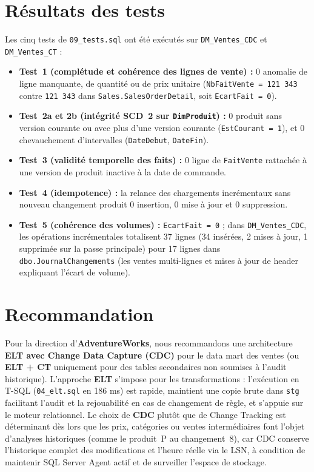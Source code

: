 \documentclass[9pt,a4paper]{article}
\begin{document}
\section{Résultats des tests}

Les cinq tests de \texttt{09\_tests.sql} ont été exécutés sur \texttt{DM\_Ventes\_CDC} et \texttt{DM\_Ventes\_CT} :
\begin{itemize}
  \item \textbf{Test~1 (complétude et cohérence des lignes de vente) :} 0 anomalie de ligne manquante, de quantité ou de prix unitaire (\texttt{NbFaitVente = 121\,343} contre \texttt{121\,343} dans \texttt{Sales.SalesOrderDetail}, soit \texttt{EcartFait = 0}).
  \item \textbf{Test~2a et 2b (intégrité SCD~2 sur \texttt{DimProduit}) :} 0 produit sans version courante ou avec plus d'une version courante (\texttt{EstCourant = 1}), et 0 chevauchement d'intervalles (\texttt{DateDebut}, \texttt{DateFin}).
  \item \textbf{Test~3 (validité temporelle des faits) :} 0 ligne de \texttt{FaitVente} rattachée à une version de produit inactive à la date de commande.
  \item \textbf{Test~4 (idempotence) :} la relance des chargements incrémentaux sans nouveau changement produit 0 insertion, 0 mise à jour et 0 suppression.
  \item \textbf{Test~5 (cohérence des volumes) :} \texttt{EcartFait = 0} ; dans \texttt{DM\_Ventes\_CDC}, les opérations incrémentales totalisent 37 lignes (34 insérées, 2 mises à jour, 1 supprimée sur la passe principale) pour 17 lignes dans \texttt{dbo.JournalChangements} (les ventes multi-lignes et mises à jour de header expliquant l'écart de volume).
\end{itemize}

\section{Recommandation}

Pour la direction d'\textbf{AdventureWorks}, nous recommandons une architecture \textbf{ELT avec Change Data Capture (CDC)} pour le data mart des ventes (ou \textbf{ELT + CT} uniquement pour des tables secondaires non soumises à l'audit historique). L'approche \textbf{ELT} s'impose pour les transformations : l'exécution en T-SQL (\texttt{04\_elt.sql} en 186 ms) est rapide, maintient une copie brute dans \texttt{stg} facilitant l'audit et la rejouabilité en cas de changement de règle, et s'appuie sur le moteur relationnel. Le choix de \textbf{CDC} plutôt que de Change Tracking est déterminant dès lors que les prix, catégories ou ventes intermédiaires font l'objet d'analyses historiques (comme le produit~P au changement~8), car CDC conserve l'historique complet des modifications et l'heure réelle via le LSN, à condition de maintenir SQL Server Agent actif et de surveiller l'espace de stockage.
\end{document}
